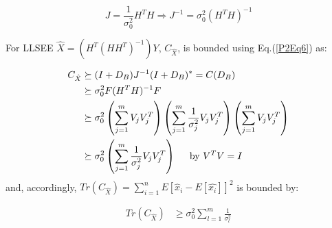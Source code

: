 
\begin{equation}\label{P2Eq9}
J  = \frac{1}{\sigma^{2}_{0}} H^{T}H \Rightarrow J^{-1}=\sigma^{2}_{0} (H^{T}H)^{-1}
\end{equation}

For LLSEE $\hat{X}=(H^{T}(HH^{T})^{-1})Y$, $C_{\hat{X}}$,  is bounded using Eq.(\ref{P2Eq6}) as:

\begin{equation}\label{P2Eq10}
\begin{aligned}
C_{\hat{X}} & \succeq  (I+D_{B})J^{-1}(I+D_{B})^{*}=C(D_{B}) \\
            & \succeq  \sigma^{2}_{0} F (H^{T}H)^{-1} F \\
            & \succeq  \sigma^{2}_{0} \left( \sum_{j=1}^{m} V_{j}V_{j}^{T} \right)  \left( \sum_{j=1}^{m} \frac{1}{\sigma^{2}_{j}} V_{j}V_{j}^{T}  \right)   \left( \sum_{j=1}^{m} V_{j}V_{j}^{T} \right) \\
            & \succeq  \sigma^{2}_{0}   \left( \sum_{j=1}^{m} \frac{1}{\sigma^{2}_{j}} V_{j}V_{j}^{T} \right) \hspace{0.5cm} \text{by $V^{T}V=I$}\\
\end{aligned}
\end{equation}
and, accordingly, $Tr(C_{\hat{X}})=\sum_{i=1}^{n}E\left[\hat{x}_{i}-E[\hat{x_{i}}]\right]^{2}$ is bounded by:

\begin{equation}\label{P2Eq11}
\begin{aligned}
Tr(C_{\hat{X}}) & \geq  \sigma^{2}_{0} \sum_{l=1}^{m} \frac{1}{\sigma^{2}_{l}}
\end{aligned}
\end{equation}


